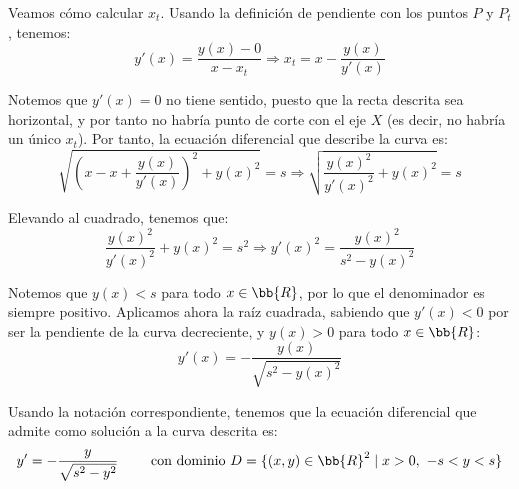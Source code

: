 \begin{ejercicio}
    Veamos cómo calcular $x_t$. Usando la definición de pendiente con los puntos $P$ y $P_t$, tenemos:
    \begin{equation*}
        y'(x) = \dfrac{y(x) - 0}{x - x_t} \Longrightarrow x_t = x - \dfrac{y(x)}{y'(x)}
    \end{equation*}

    Notemos que $y'(x)=0$ no tiene sentido, puesto que la recta descrita sea horizontal, y por tanto no habría punto de corte con el eje $X$ (es decir, no habría un único $x_t$). Por tanto, la ecuación diferencial que describe la curva es:
    \begin{equation*}
        \sqrt{\left(x-x + \dfrac{y(x)}{y'(x)}\right)^2 + y(x)^2} = s
        \Longrightarrow
        \sqrt{\dfrac{y(x)^2}{y'(x)^2} + y(x)^2} = s
    \end{equation*}

    Elevando al cuadrado, tenemos que:
    \begin{equation*}
        \dfrac{y(x)^2}{y'(x)^2} + y(x)^2 = s^2
        \Longrightarrow
        y'(x)^2 = \dfrac{y(x)^2}{s^2 - y(x)^2}
    \end{equation*}

    Notemos que $y(x)<s$ para todo $x\in \bb{R}$, por lo que el denominador es siempre positivo. Aplicamos ahora la raíz cuadrada, sabiendo que $y'(x)<0$ por ser la pendiente de la curva decreciente, y $y(x)>0$ para todo $x\in \bb{R}$:
    \begin{equation*}
        y'(x) = -\dfrac{y(x)}{\sqrt{s^2 - y(x)^2}}
    \end{equation*}

    Usando la notación correspondiente, tenemos que la ecuación diferencial que admite como solución a la curva descrita es:
    \begin{equation*}
        y' = -\dfrac{y}{\sqrt{s^2 - y^2}} \qquad \text{ con dominio } D=\{(x, y)\in \bb{R}^2 \mid x>0,~-s<y<s\}
    \end{equation*}
\end{ejercicio}


